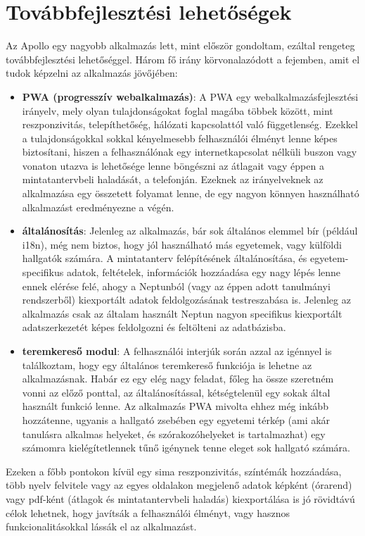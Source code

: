 \documentclass[a4paper,12pt]{report}
\begin{document}
\section{Továbbfejlesztési lehetőségek}

Az Apollo egy nagyobb alkalmazás lett, mint először gondoltam, ezáltal rengeteg továbbfejlesztési lehetőséggel. Három fő irány körvonalazódott a fejemben, amit el tudok képzelni az alkalmazás jövőjében:

\begin{itemize}
    \item \textbf{PWA (progresszív webalkalmazás)}: A PWA egy webalkalmazásfejlesztési irányelv, mely olyan tulajdonságokat foglal magába többek között, mint reszponzivitás, telepíthetőség, hálózati kapcsolattól való függetlenség. Ezekkel a tulajdonságokkal sokkal kényelmesebb felhasználói élményt lenne képes biztosítani, hiszen a felhasználónak egy internetkapcsolat nélküli buszon vagy vonaton utazva is lehetősége lenne böngészni az átlagait vagy éppen a mintatantervbeli haladását, a telefonján. Ezeknek az irányelveknek az alkalmazása egy összetett folyamat lenne, de egy nagyon könnyen használható alkalmazást eredményezne a végén.
    \item \textbf{általánosítás}: Jelenleg az alkalmazás, bár sok általános elemmel bír (például i18n), még nem biztos, hogy jól használható más egyetemek, vagy külföldi hallgatók számára. A mintatanterv felépítésének általánosítása, és egyetem-specifikus adatok, feltételek, információk hozzáadása egy nagy lépés lenne ennek elérése felé, ahogy a Neptunból (vagy az éppen adott tanulmányi rendszerből) kiexportált adatok feldolgozásának testreszabása is. Jelenleg az alkalmazás csak az általam használt Neptun nagyon specifikus kiexportált adatszerkezetét képes feldolgozni és feltölteni az adatbázisba.
    \item \textbf{teremkereső modul}: A felhasználói interjúk során azzal az igénnyel is találkoztam, hogy egy általános teremkereső funkciója is lehetne az alkalmazásnak. Habár ez egy elég nagy feladat, főleg ha össze szeretném vonni az előző ponttal, az általánosítással, kétségtelenül egy sokak által használt funkció lenne. Az alkalmazás PWA mivolta ehhez még inkább hozzátenne, ugyanis a hallgató zsebében egy egyetemi térkép (ami akár tanulásra alkalmas helyeket, és szórakozóhelyeket is tartalmazhat) egy számomra kielégítetlennek tűnő igénynek tenne eleget sok hallgató számára.
\end{itemize}

Ezeken a főbb pontokon kívül egy sima reszponzivitás, színtémák hozzáadása, több nyelv felvitele vagy az egyes oldalakon megjelenő adatok képként (órarend) vagy pdf-ként (átlagok és mintatantervbeli haladás) kiexportálása is jó rövidtávú célok lehetnek, hogy javítsák a felhasználói élményt, vagy hasznos funkcionalitásokkal lássák el az alkalmazást.
\end{document}
